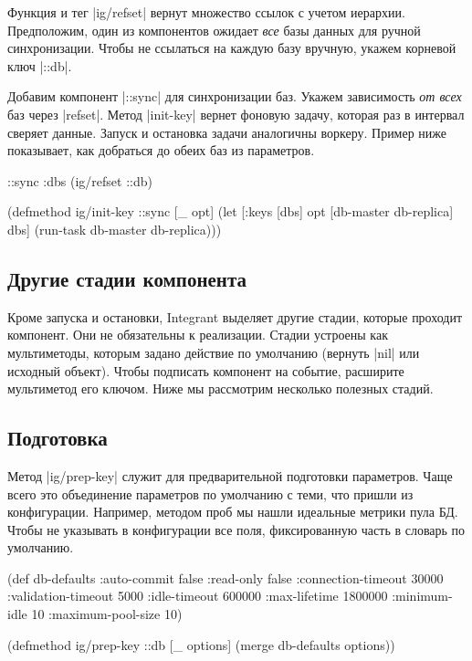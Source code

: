 Функция и тег \spverb|ig/refset| вернут множество ссылок с учетом
иерархии. Предположим, один из компонентов ожидает \emph{все} базы данных для
ручной синхронизации. Чтобы не ссылаться на каждую базу вручную, укажем корневой
ключ \spverb|::db|.

Добавим компонент \spverb|::sync| для синхронизации баз. Укажем зависимость
\emph{от всех} баз через \spverb|refset|. Метод \spverb|init-key| вернет фоновую
задачу, которая раз в интервал сверяет данные. Запуск и остановка задачи
аналогичны воркеру. Пример ниже показывает, как добраться до обеих баз из
параметров.

\begin{english}
  \begin{clojure}
{::sync {:dbs (ig/refset ::db)}}

(defmethod ig/init-key ::sync
  [_ opt]
  (let [{:keys [dbs]} opt
        [db-master db-replica] dbs]
    (run-task db-master db-replica)))
  \end{clojure}
\end{english}

\subsection{Другие стадии компонента}

Кроме запуска и остановки, Integrant выделяет другие стадии, которые
проходит компонент. Они не обязательны к реализации. Стадии устроены как
мультиметоды, которым задано действие по умолчанию (вернуть \spverb|nil| или
исходный объект). Чтобы подписать компонент на событие, расширите мультиметод
его ключом. Ниже мы рассмотрим несколько полезных стадий.

\subsection{Подготовка}

Метод \spverb|ig/prep-key| служит для предварительной подготовки
параметров. Чаще всего это объединение параметров по умолчанию с теми, что
пришли из конфигурации. Например, методом проб мы нашли идеальные метрики пула
БД. Чтобы не указывать в конфигурации все поля, фиксированную часть в словарь по
умолчанию.

\begin{english}
  \begin{clojure}
(def db-defaults
  {:auto-commit        false
   :read-only          false
   :connection-timeout 30000
   :validation-timeout 5000
   :idle-timeout       600000
   :max-lifetime       1800000
   :minimum-idle       10
   :maximum-pool-size  10})

(defmethod ig/prep-key ::db
  [_ options]
  (merge db-defaults options))
  \end{clojure}
\end{english}

